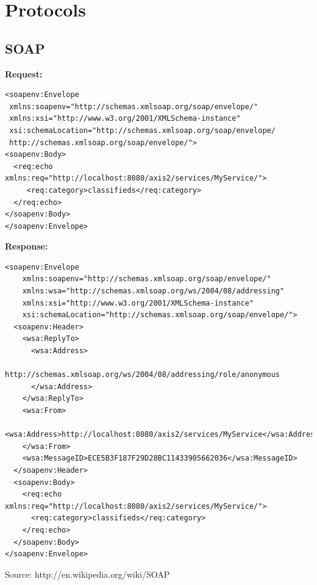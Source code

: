 \documentclass[titlepage]{article}
\begin{document}

\appendix
\pagebreak

\section{Protocols}
\subsection{SOAP \label{a:soap}}

\lstset{language=XML}

\textbf{Request:}
\begin{lstlisting}
<soapenv:Envelope
 xmlns:soapenv="http://schemas.xmlsoap.org/soap/envelope/"
 xmlns:xsi="http://www.w3.org/2001/XMLSchema-instance"
 xsi:schemaLocation="http://schemas.xmlsoap.org/soap/envelope/
 http://schemas.xmlsoap.org/soap/envelope/">
<soapenv:Body>
  <req:echo xmlns:req="http://localhost:8080/axis2/services/MyService/">
     <req:category>classifieds</req:category>
  </req:echo>
</soapenv:Body>
</soapenv:Envelope>
\end{lstlisting}

\noindent\textbf{Response:}
\begin{lstlisting}
<soapenv:Envelope
    xmlns:soapenv="http://schemas.xmlsoap.org/soap/envelope/"
    xmlns:wsa="http://schemas.xmlsoap.org/ws/2004/08/addressing"
    xmlns:xsi="http://www.w3.org/2001/XMLSchema-instance"
    xsi:schemaLocation="http://schemas.xmlsoap.org/soap/envelope/">
  <soapenv:Header>
    <wsa:ReplyTo>
      <wsa:Address>
        http://schemas.xmlsoap.org/ws/2004/08/addressing/role/anonymous
      </wsa:Address>
    </wsa:ReplyTo>
    <wsa:From>
      <wsa:Address>http://localhost:8080/axis2/services/MyService</wsa:Address>
    </wsa:From>
    <wsa:MessageID>ECE5B3F187F29D28BC11433905662036</wsa:MessageID>
  </soapenv:Header>
  <soapenv:Body>
    <req:echo xmlns:req="http://localhost:8080/axis2/services/MyService/">
      <req:category>classifieds</req:category>
    </req:echo>
  </soapenv:Body>
</soapenv:Envelope>
\end{lstlisting}
Source: http://en.wikipedia.org/wiki/SOAP
\end{document}
